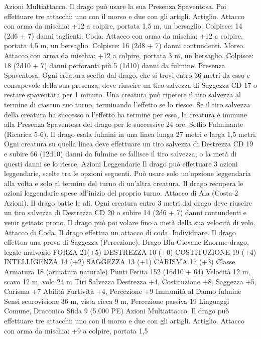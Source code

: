\begin{multicols}{2}
Azioni
Multiattacco. Il drago può usare la sua Presenza Spaventosa. Poi
effettuare tre attacchi: uno con il morso e due con gli artigli.
Artiglio. Attacco con arma da mischia: +12 a colpire, portata 1,5
m, un bersaglio.
Colpisce: 14 (2d6 + 7) danni taglienti.
Coda. Attacco con arma da mischia: +12 a colpire, portata 4,5
m, un bersaglio.
Colpisce: 16 (2d8 + 7) danni contundenti.
Morso. Attacco con arma da mischia: +12 a colpire, portata 3 m,
un bersaglio.
Colpisce: 18 (2d10 + 7) danni perforanti più 5 (1d10) danni da
fulmine.
Presenza Spaventosa. Ogni creatura scelta dal drago, che si trovi
entro 36 metri da esso e consapevole della sua presenza, deve
riuscire un tiro salvezza di Saggezza CD 17 o restare spaventata
per 1 minuto. Una creatura può ripetere il tiro salvezza al termine
di ciascun suo turno, terminando l’effetto se lo riesce. Se il tiro
salvezza della creatura ha successo o l’effetto ha termine per
essa, la creatura è immune alla Presenza Spaventosa del drago
per le successive 24 ore.
Soffio Fulminante (Ricarica 5-6). Il drago esala fulmini in una
linea lunga 27 metri e larga 1,5 metri. Ogni creatura su quella
linea deve effettuare un tiro salvezza di Destrezza CD 19 e subire
66 (12d10) danni da fulmine se fallisce il tiro salvezza, o la metà
di questi danni se lo riesce.
Azioni Leggendarie
Il drago può effettuare 3 azioni leggendarie, scelte tra le opzioni
seguenti. Può usare solo un’opzione leggendaria alla volta e solo
al termine del turno di un’altra creatura. Il drago recupera le
azioni leggendarie spese all’inizio del proprio turno.
Attacco di Ala (Costa 2 Azioni). Il drago batte le ali. Ogni
creatura entro 3 metri dal drago deve riuscire un tiro salvezza di
Destrezza CD 20 o subire 14 (2d6 + 7) danni contundenti e venir
gettato prono. Il drago può poi volare fino a metà della sua
velocità di volo.
Attacco di Coda. Il drago effettua un attacco di coda.
Individuare. Il drago effettua una prova di Saggezza
(Percezione).
Drago Blu Giovane
Enorme drago, legale malvagio
FORZA 21(+5)
DESTREZZA 10 (+0)
COSTITUZIONE 19 (+4)
INTELLIGENZA 14 (+2)
SAGGEZZA 13 (+1)
CARISMA 17 (+3)
Classe Armatura 18 (armatura naturale)
Punti Ferita 152 (16d10 + 64)
Velocità 12 m, scavo 12 m, volo 24 m
Tiri Salvezza Destrezza +4, Costituzione +8, Saggezza +5,
Carisma +7
Abilità Furtività +4, Percezione +9
Immunità al Danno fulmine
Sensi scurovisione 36 m, vista cieca 9 m, Percezione passiva 19
Linguaggi Comune, Draconico
Sfida 9 (5.000 PE)
Azioni
Multiattacco. Il drago può effettuare tre attacchi: uno con il
morso e due con gli artigli.
Artiglio. Attacco con arma da mischia: +9 a colpire, portata 1,5

\end{multicols}
